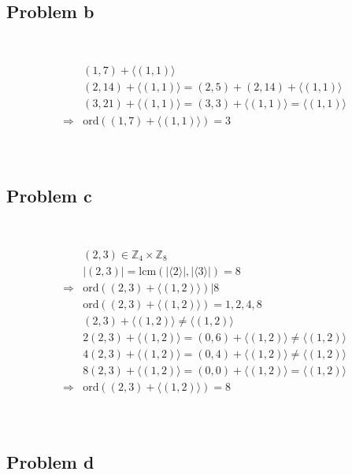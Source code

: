 \documentclass{article}
\begin{document}
~

\subsection*{Problem b}

~

\begin{equation*}
    \begin{split}
        &(1,7)+\langle(1,1)\rangle\\
        &(2,14)+\langle(1,1)\rangle=(2,5)+(2,14)+\langle(1,1)\rangle\\
        &(3,21)+\langle(1,1)\rangle=(3,3)+\langle(1,1)\rangle=\langle(1,1)\rangle\\
        \Rightarrow&\text{ord}((1,7)+\langle(1,1)\rangle)=3\\
    \end{split}
\end{equation*}

~

\subsection*{Problem c}

~

\begin{equation*}
    \begin{split}
        &(2,3)\in\mathbb{Z} _4\times\mathbb{Z} _8\\
        &|(2,3)|=\text{lcm}(|\langle2\rangle|,|\langle3\rangle|)=8\\
        \Rightarrow&\text{ord}((2,3)+\langle(1,2)\rangle)|8\\
        &\text{ord}((2,3)+\langle(1,2)\rangle)=1,2,4,8\\
        &(2,3)+\langle(1,2)\rangle\ne\langle(1,2)\rangle\\
        &2(2,3)+\langle(1,2)\rangle=(0,6)+\langle(1,2)\rangle\ne\langle(1,2)\rangle\\
        &4(2,3)+\langle(1,2)\rangle=(0,4)+\langle(1,2)\rangle\ne\langle(1,2)\rangle\\
        &8(2,3)+\langle(1,2)\rangle=(0,0)+\langle(1,2)\rangle=\langle(1,2)\rangle\\
        \Rightarrow&\text{ord}((2,3)+\langle(1,2)\rangle)=8\\
    \end{split}
\end{equation*}

~

\subsection*{Problem d}
\end{document}
